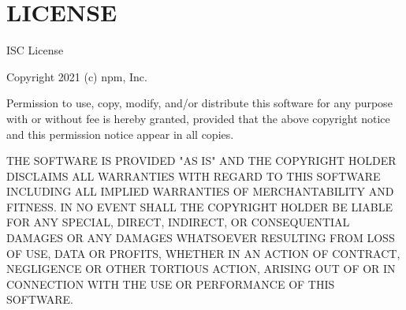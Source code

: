 \chapter{LICENSE}
\hypertarget{md__d_1_2_g_i_t_2_food_link_2foodlink_8client_2node__modules_2ssri_2_l_i_c_e_n_s_e}{}\label{md__d_1_2_g_i_t_2_food_link_2foodlink_8client_2node__modules_2ssri_2_l_i_c_e_n_s_e}
ISC License

Copyright 2021 (c) npm, Inc.

Permission to use, copy, modify, and/or distribute this software for any purpose with or without fee is hereby granted, provided that the above copyright notice and this permission notice appear in all copies.

THE SOFTWARE IS PROVIDED "{}\+AS IS"{} AND THE COPYRIGHT HOLDER DISCLAIMS ALL WARRANTIES WITH REGARD TO THIS SOFTWARE INCLUDING ALL IMPLIED WARRANTIES OF MERCHANTABILITY AND FITNESS. IN NO EVENT SHALL THE COPYRIGHT HOLDER BE LIABLE FOR ANY SPECIAL, DIRECT, INDIRECT, OR CONSEQUENTIAL DAMAGES OR ANY DAMAGES WHATSOEVER RESULTING FROM LOSS OF USE, DATA OR PROFITS, WHETHER IN AN ACTION OF CONTRACT, NEGLIGENCE OR OTHER TORTIOUS ACTION, ARISING OUT OF OR IN CONNECTION WITH THE USE OR PERFORMANCE OF THIS SOFTWARE. 
